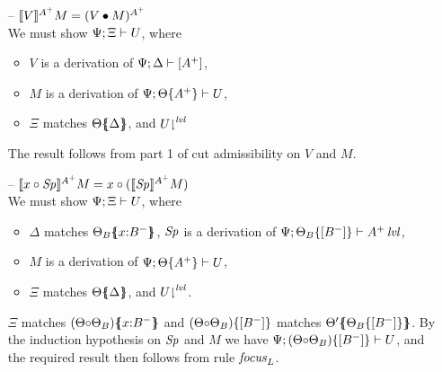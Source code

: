 \begin{itemize}
\item[--] $\lsubsta{\tfocusr{V}}{M}{A^+} = (\subst{V}{M})^{A^+}$\smallskip\\
  We must show $\foc{\Psi}{\Xi}{U}$, where
  \begin{itemize}
  \item $V$ is a derivation of $\foc{\Psi}{\Delta}{[A^+]}$,
  \item $M$ is a derivation of $\foc{\Psi}{\tackon{\Theta}{A^+}}{U}$,
  \item $\Xi$ matches $\frameoff{\Theta}{\Delta}$, and 
    $\restrictfrom{U}{\mlvl}$
  \end{itemize}
  The result follows from part 1 of cut admissibility
  on $V$ and $M$. \smallskip

\item[--] $\lsubsta{\tfocusl{x}{\Sp}}{M}{A^+}
           = \tfocusl{x}{(\lsubsta{\Sp}{M}{A^+})}$\smallskip\\
  We must show $\foc{\Psi}{\Xi}{U}$, where
  \begin{itemize}
  \item $\Delta$ matches $\frameoff{\Theta_B}{x{:}B^-}$, 
    $\Sp$ is a derivation of
    $\foc{\Psi}{\tackon{\Theta_B}{[B^-]}}{\islvl{A^+}}$,
  \item $M$ is a derivation of $\foc{\Psi}{\tackon{\Theta}{A^+}}{U}$,
  \item $\Xi$ matches $\frameoff{\Theta}{\Delta}$, and
    $\restrictfrom{U}{\mlvl}$.
  \end{itemize}
  $\Xi$ matches $\frameoff{(\Theta {\circ} \Theta_B)}{x{:}B^-}$
  and $\tackon{(\Theta {\circ} \Theta_B)}{[B^-]}$ matches
  $\frameoff{\Theta'}{\tackon{\Theta_B}{[B^-]}}$. By the induction
  hypothesis on $\Sp$ and $M$ we have 
  $\foc{\Psi}{\tackon{(\Theta {\circ} \Theta_B)}{[B^-]}}{U}$, and
  the required result then follows from rule ${\it focus}_L$. \smallskip
  

\end{itemize}
